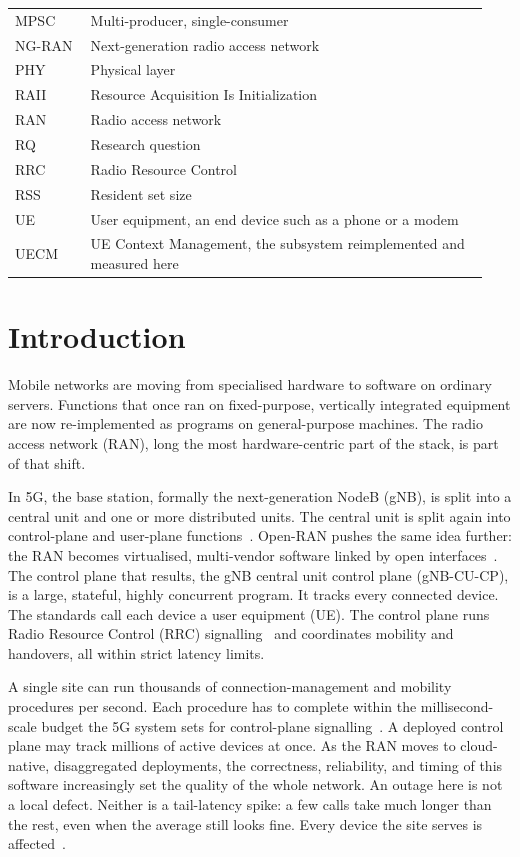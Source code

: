 \documentclass[english,oneside,a4paper,censored,csm,software-track-2020]{HYthesisML}
\begin{document}
\begin{longtable}{@{}p{0.15\linewidth} p{0.79\linewidth}@{}}
MPSC & Multi-producer, single-consumer \\
NG-RAN & Next-generation radio access network \\
PHY & Physical layer \\
RAII & Resource Acquisition Is Initialization \\
RAN & Radio access network \\
RQ & Research question \\
RRC & Radio Resource Control \\
RSS & Resident set size \\
UE & User equipment, an end device such as a phone or a modem \\
UECM & UE Context Management, the subsystem reimplemented and measured here \\
\hline
\end{longtable}
\endgroup

\cleardoublepage
\mainmatter


\chapter{Introduction}

Mobile networks are moving from specialised hardware to software on ordinary servers.
Functions that once ran on fixed-purpose, vertically integrated equipment are now
re-implemented as programs on general-purpose machines. The radio access network (RAN),
long the most hardware-centric part of the stack, is part of that shift.

In 5G, the base station, formally the next-generation NodeB (gNB), is split into a central
unit and one or more distributed units. The central unit is split again into control-plane
and user-plane functions~\cite{3gpp38401,3gpp38300}. Open-RAN pushes the same idea further:
the RAN becomes virtualised, multi-vendor software linked by open
interfaces~\cite{polese2023oran}. The control plane that results, the gNB central unit
control plane (gNB-CU-CP), is a large, stateful, highly concurrent program. It tracks every
connected device. The standards call each device a user equipment (UE). The control plane runs
Radio Resource Control (RRC) signalling~\cite{3gpp38331} and coordinates mobility and
handovers, all within strict latency limits.

A single site can run thousands of connection-management and
mobility procedures per second. Each procedure has to complete within the millisecond-scale
budget the 5G system sets for control-plane signalling~\cite{3gpp38913}. A deployed control plane may track millions of active
devices at once. As the RAN moves to cloud-native, disaggregated deployments, the
correctness, reliability, and timing of this software increasingly set the quality of the
whole network. An outage here is not a local defect. Neither is a tail-latency
spike: a few calls take much longer than the rest, even when the average still
looks fine. Every device the site serves is
affected~\cite{dean2013tail,barroso2017microseconds}.
\end{document}
